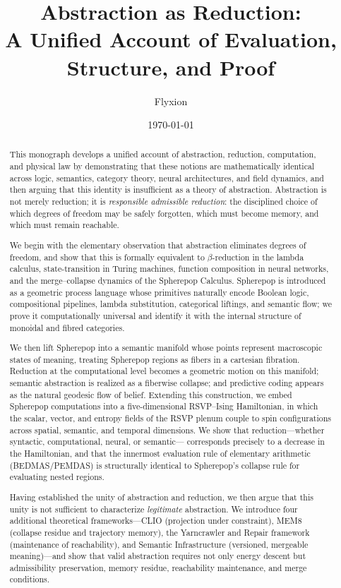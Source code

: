 \documentclass[12pt,letterpaper]{article}
\title{\textbf{Abstraction as Reduction:}\\
A Unified Account of Evaluation, Structure, and Proof}
\author{Flyxion}
\date{\today}
\theoremstyle{remark}
\begin{document}
\maketitle
\thispagestyle{empty}

\begin{abstract}
This monograph develops a unified account of abstraction, reduction,
computation, and physical law by demonstrating that these notions are
mathematically identical across logic, semantics, category theory, neural
architectures, and field dynamics, and then arguing that this identity is
insufficient as a theory of abstraction.  Abstraction is not merely
reduction; it is \emph{responsible admissible reduction}: the disciplined
choice of which degrees of freedom may be safely forgotten, which must
become memory, and which must remain reachable.

We begin with the elementary observation that abstraction eliminates degrees
of freedom, and show that this is formally equivalent to $\beta$-reduction
in the lambda calculus, state-transition in Turing machines, function
composition in neural networks, and the merge--collapse dynamics of the
Spherepop Calculus.  Spherepop is introduced as a geometric process
language whose primitives naturally encode Boolean logic, compositional
pipelines, lambda substitution, categorical liftings, and semantic flow;
we prove it computationally universal and identify it with the internal
structure of monoidal and fibred categories.

We then lift Spherepop into a semantic manifold whose points represent
macroscopic states of meaning, treating Spherepop regions as fibers in a
cartesian fibration.  Reduction at the computational level becomes a
geometric motion on this manifold; semantic abstraction is realized as a
fiberwise collapse; and predictive coding appears as the natural geodesic
flow of belief.  Extending this construction, we embed Spherepop
computations into a five-dimensional RSVP--Ising Hamiltonian, in which the
scalar, vector, and entropy fields of the RSVP plenum couple to spin
configurations across spatial, semantic, and temporal dimensions.  We show
that reduction---whether syntactic, computational, neural, or semantic---
corresponds precisely to a decrease in the Hamiltonian, and that the
innermost evaluation rule of elementary arithmetic (BEDMAS/PEMDAS) is
structurally identical to Spherepop's collapse rule for evaluating nested
regions.

Having established the unity of abstraction and reduction, we then argue
that this unity is not sufficient to characterize \emph{legitimate}
abstraction.  We introduce four additional theoretical frameworks---CLIO
(projection under constraint), MEM\textbar{}8 (collapse residue and
trajectory memory), the Yarncrawler and Repair framework (maintenance of
reachability), and Semantic Infrastructure (versioned, mergeable
meaning)---and show that valid abstraction requires not only energy descent
but admissibility preservation, memory residue, reachability maintenance,
and merge conditions.


\end{abstract}
\end{document}
